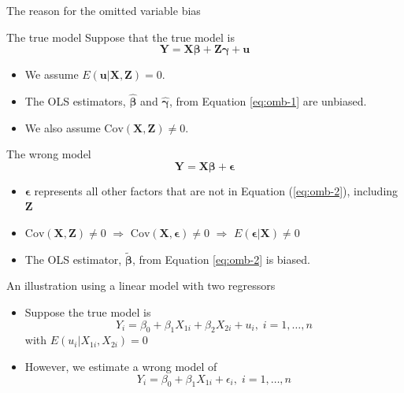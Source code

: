 \documentclass[presentation,10pt]{beamer}
\newcommand{\cov}{\mathrm{Cov}}
\begin{document}
\begin{frame}[shrink,plain,label={sec:org1a51455}]{The reason for the omitted variable bias}
\begin{block}{The true model}
Suppose that the true model is
\begin{equation}
\label{eq:omb-1}
\mathbf{Y} = \mathbf{X}\boldsymbol{\beta} + \mathbf{Z}\boldsymbol{\gamma} + \mathbf{u}
\end{equation}
\begin{itemize}
\item We assume \(E(\mathbf{u} | \mathbf{X}, \mathbf{Z}) = 0\).
\item The OLS estimators, \(\hat{\boldsymbol{\beta}}\) and
\(\hat{\boldsymbol{\gamma}}\), from Equation \eqref{eq:omb-1} are unbiased.
\item We also assume \(\cov(\mathbf{X}, \mathbf{Z}) \neq 0\).
\end{itemize}
\end{block}

\begin{block}{The wrong model}
\begin{equation}
\label{eq:omb-2}
\mathbf{Y} = \mathbf{X}\boldsymbol{\beta} + \boldsymbol{\epsilon}
\end{equation}

\begin{itemize}
\item \(\boldsymbol{\epsilon}\) represents all other factors that are not
in Equation (\ref{eq:omb-2}), including \(\mathbf{Z}\)
\item \(\cov(\mathbf{X}, \mathbf{Z}) \neq 0\) \(\Rightarrow\) \(\cov(\mathbf{X},
  \boldsymbol{\epsilon}) \neq 0\) \(\Rightarrow\)
\(E(\boldsymbol{\epsilon} | \mathbf{X}) \neq 0\)
\item The OLS estimator, \(\tilde{\boldsymbol{\beta}}\), from Equation
\eqref{eq:omb-2} is biased.
\end{itemize}
\end{block}
\end{frame}

\begin{frame}[label={sec:orga4d720b}]{An illustration using a linear model with two regressors}
\begin{itemize}
\item Suppose the true model is
\[ Y_i = \beta_0 + \beta_1 X_{1i} + \beta_2 X_{2i} + u_i,\; i=1,
  \ldots, n \]
with \(E(u_i | X_{1i}, X_{2i}) = 0\)

\item However, we estimate a wrong model of
\[ Y_i = \beta_0 + \beta_1 X_{1i} + \epsilon_i,\; i=1, \ldots, n \]
\end{itemize}
\end{frame}
\end{document}
